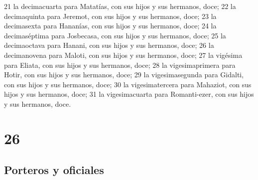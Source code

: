 21 la decimacuarta para Matatías, con sus hijos y sus hermanos, doce;
22 la decimaquinta para Jeremot, con sus hijos y sus hermanos, doce;
23 la decimasexta para Hananías, con sus hijos y sus hermanos, doce;
24 la decimaséptima para Josbecasa, con sus hijos y sus hermanos, doce;
25 la decimaoctava para Hanani, con sus hijos y sus hermanos, doce;
26 la decimanovena para Maloti, con sus hijos y sus hermanos, doce;
27 la vigésima para Eliata, con sus hijos y sus hermanos, doce;
28 la vigesimaprimera para Hotir, con sus hijos y sus hermanos, doce;
29 la vigesimasegunda para Gidalti, con sus hijos y sus hermanos, doce;
30 la vigesimatercera para Mahaziot, con sus hijos y sus hermanos, doce;
31 la vigesimacuarta para Romanti-ezer, con sus hijos y sus hermanos, doce.

\chapter{26}

\section*{Porteros y oficiales}


